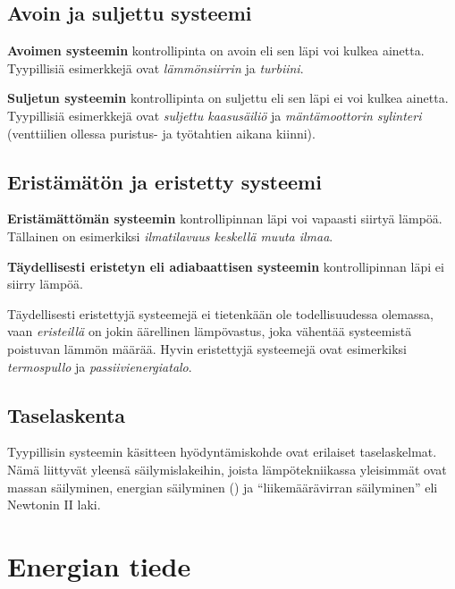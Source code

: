 \documentclass[12pt,a4paper,finnish]{book}
\begin{document}
\section{Avoin ja suljettu systeemi} %

\textbf{Avoimen systeemin} kontrollipinta on avoin eli sen läpi voi kulkea ainetta. Tyypillisiä esimerkkejä 
ovat \textit{lämmönsiirrin} ja \textit{turbiini}.

\textbf{Suljetun systeemin} kontrollipinta on suljettu eli sen läpi ei voi kulkea ainetta. Tyypillisiä 
esimerkkejä ovat \textit{suljettu kaasusäiliö} ja \textit{mäntämoottorin sylinteri} (venttiilien ollessa 
puristus- ja työtahtien aikana kiinni).

\section{Eristämätön ja eristetty systeemi}%

\textbf{Eristämättömän systeemin} kontrollipinnan läpi voi vapaasti siirtyä lämpöä. 
Tällainen on esimerkiksi \textit{ilmatilavuus keskellä muuta ilmaa}.

\textbf{Täydellisesti eristetyn eli adiabaattisen systeemin} kontrollipinnan läpi ei siirry lämpöä.

Täydellisesti eristettyjä systeemejä ei tietenkään ole todellisuudessa olemassa, vaan \textit{eristeillä} 
on jokin äärellinen lämpövastus, joka vähentää systeemistä poistuvan lämmön määrää. Hyvin eristettyjä 
systeemejä ovat esimerkiksi \textit{termospullo} ja \textit{passiivienergiatalo}.

\section{Taselaskenta} %

Tyypillisin systeemin käsitteen hyödyntämiskohde ovat erilaiset taselaskelmat. Nämä liittyvät 
yleensä säilymislakeihin, joista lämpötekniikassa yleisimmät ovat massan säilyminen, energian 
säilyminen () ja ``liikemäärävirran säilyminen'' eli Newtonin II laki.

\chapter{Energian tiede} %
\end{document}
